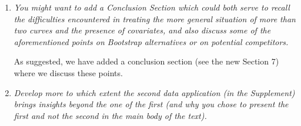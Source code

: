 \documentclass[a4paper,12pt]{article}
\begin{document}
\begin{enumerate}[label=\arabic*.,leftmargin=0.6cm]



\item \textit{You might want to add a Conclusion Section which could both serve to recall the difficulties encountered in treating the more general situation of more than two curves and the presence of
covariates, and also discuss some of the aforementioned points on Bootstrap alternatives or on potential competitors.}  

As suggested, we have added a conclusion section (see the new Section 7) where we discuss these points. 


\item \textit{Develop more to which extent the second data application (in the Supplement) brings insights beyond the one of the first (and why you chose to present the first and not the second in the main body of the text).}


\end{enumerate}
\end{document}
